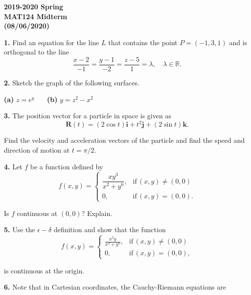 \documentclass{article}
\begin{document}
\pagestyle{empty}
\large

\begin{center}
\textbf{2019-2020 Spring \\MAT124 Midterm\\(08/06/2020)}
\end{center}

\textbf{1.} Find an equation for the line $L$ that contains the point $P= (-1,3,1)$ and is orthogonal to the line
\[\frac{x-2}{-1}=\frac{y-1}{-2}=\frac{z-5}{1}=\lambda,\quad\lambda\in\mathbb{R}.\]

\vspace{1em}

\textbf{2.} Sketch the graph of the following surfaces.

\textbf{(a)} $z= e^y$ \ \ \ \textbf{(b)} $y=z^2-x^2$

\vspace{1em}

\textbf{3.} The position vector for a particle in space is given as
\[\textbf{R}(t) = (2\cos t)\textbf{i}+t^2\textbf{j}+(2\sin t)\textbf{k}.\]
    
Find the velocity and acceleration vectors of the particle and find the speed and direction of motion at $t=\pi/2$.

\vspace{1em}

\textbf{4.} Let $f$ be a function defined by
\[
f(x,y) =
\left.
\begin{cases}
\dfrac{xy^3}{x^2+y^6},&\text{if}\, (x, y)\neq (0,0)\\[1em]0,&\text{if}\,(x,y)=(0,0).
\end{cases}
\right.
\]

Is $f$ continuous at $(0,0)$? Explain.

\vspace{1em}

\textbf{5.} Use the $\epsilon - \delta$ definition and show that the function
\[
f(x,y) =
\left.
\begin{cases}
\displaystyle \frac{x^2y}{x^2+y^6},&\text{if}\, (x, y)\neq (0,0)\\[1em]0,&\text{if}\,(x,y)=(0,0),
\end{cases}
\right.
\]

is continuous at the origin.

\vspace{1em}

\textbf{6.} Note that in Cartesian coordinates, the Cauchy-Riemann equations are
\end{document}
